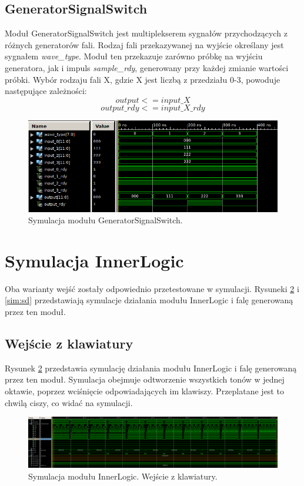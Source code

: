 \documentclass[12pt]{article}
\begin{document}
\subsection{GeneratorSignalSwitch}

Moduł GeneratorSignalSwitch jest multiplekserem sygnałów przychodzących z różnych generatorów fali. Rodzaj fali przekazywanej na wyjście określany jest sygnałem \textit{wave\_type}. Moduł ten przekazuje zarówno próbkę na wyjściu generatora, jak i impuls \textit{sample\_rdy}, generowany przy każdej zmianie wartości próbki. Wybór rodzaju fali X, gdzie X jest liczbą z przedziału 0-3, powoduje następujące zależności:
\[output <= input\_X\]
\[output\_rdy <= input\_X\_rdy\]

\begin{figure}[H]
  \centering
  \includegraphics[decodearray={1 0 1 0 1 0}, width=\linewidth]{images/generator_signal_switch.png}
  \caption{Symulacja modułu GeneratorSignalSwitch.}
  \label{sim:gen_signal_switch}
\end{figure}


\section{Symulacja InnerLogic}
Oba warianty wejść zostały odpowiednio przetestowane w symulacji. Rysuneki \ref{sim:kb} i \ref{sim:sd} przedstawiają symulacje działania modułu InnerLogic i falę generowaną przez ten moduł.
\subsection{Wejście z klawiatury}
Rysunek \ref{sim:kb} przedstawia symulację działania modułu InnerLogic i falę generowaną przez ten moduł. Symulacja obejmuje odtworzenie wszystkich tonów w jednej oktawie, poprzez wciśnięcie odpowiadających im klawiszy. Przeplatane jest to chwilą ciszy, co widać na symulacji.
\begin{figure}[H]
  \centering
  \includegraphics[decodearray={1 0 1 0 1 0}, width=\linewidth]{images/inner_sim_kb}
  \caption{Symulacja modułu InnerLogic. Wejście z klawiatury.}
  \label{sim:kb}
\end{figure}
\end{document}
